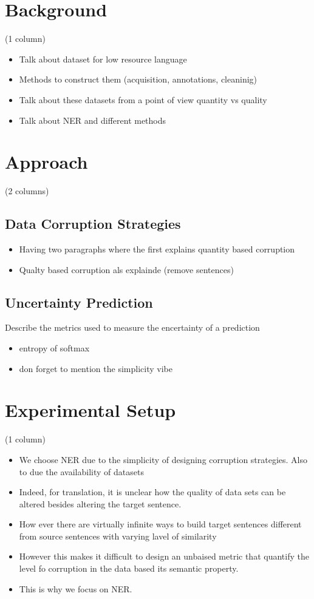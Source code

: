 \documentclass{article}
\begin{document}
\section{Background}
\label{sec:background}
(1 column)
\begin{itemize}
    \item Talk about dataset for low resource language
    \item Methods to construct them (acquisition, annotations, cleaninig)
    \item Talk about these datasets from a point of view quantity  vs quality
    \item Talk about NER and different methods
\end{itemize}

\section{Approach}
\label{sec:approach}
(2 columns)
\subsection{Data Corruption Strategies}

\begin{itemize}
\item Having two paragraphs where the first explains quantity based corruption
\item Qualty based corruption als explainde (remove sentences)
\end{itemize}

\subsection{Uncertainty Prediction}
Describe the metrics used to measure the encertainty of a prediction

\begin{itemize}
\item entropy of softmax
\item don forget to mention the simplicity vibe
\end{itemize}

\section{Experimental Setup}
\label{sec:experimental_setup}
(1 column)

\begin{itemize}
    \item We choose NER due to the simplicity of designing corruption strategies. Also to due the availability of datasets
    \item Indeed, for translation, it is unclear how the quality of data sets can be altered besides altering the target sentence.
    \item How ever there are virtually infinite ways to build target sentences different from source sentences with varying lavel of similarity
    \item However this makes it difficult to design an unbaised metric that quantify the level fo corruption in the data based its semantic property.
    \item This is why we focus on NER.
\end{itemize} 
\end{document}
